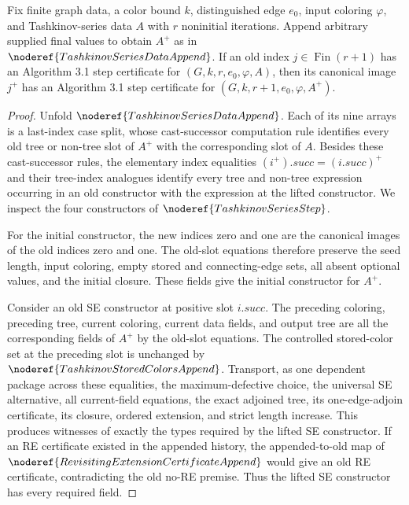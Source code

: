 \begin{lemma}
Fix finite graph data, a color bound \(k\), distinguished edge \(e_0\), input
coloring \(\varphi\), and Tashkinov-series data \(A\) with \(r\) noninitial
iterations.  Append arbitrary supplied final values to obtain \(A^+\) as in
\(\noderef{TashkinovSeriesDataAppend}\).  If an old index
\(j\in\operatorname{Fin}(r+1)\) has an Algorithm 3.1 step certificate for
\((G,k,r,e_0,\varphi,A)\), then its canonical image \(j^+\) has an Algorithm
3.1 step certificate for \((G,k,r+1,e_0,\varphi,A^+)\).
\end{lemma}
\begin{proof}
Unfold \(\noderef{TashkinovSeriesDataAppend}\).  Each of its nine arrays is a
last-index case split, whose cast-successor computation rule identifies every
old tree or non-tree slot of \(A^+\) with the corresponding slot of \(A\).
Besides these cast-successor rules, the elementary index equalities
\((i^+).succ=(i.succ)^+\) and their tree-index analogues identify every tree
and non-tree expression occurring in an old constructor with the expression
at the lifted constructor.  We inspect the four constructors of
\(\noderef{TashkinovSeriesStep}\).

For the initial constructor, the new indices zero and one are the canonical
images of the old indices zero and one.  The old-slot equations therefore
preserve the seed length, input coloring, empty stored and connecting-edge
sets, all absent optional values, and the initial closure.  These fields give
the initial constructor for \(A^+\).

Consider an old SE constructor at positive slot \(i.succ\).  The preceding
coloring, preceding tree, current coloring, current data fields, and output
tree are all the corresponding fields of \(A^+\) by the old-slot equations.
The controlled stored-color set at the preceding slot is unchanged by
\(\noderef{TashkinovStoredColorsAppend}\).  Transport, as one dependent
package across these equalities, the maximum-defective choice, the universal
SE alternative, all current-field equations, the exact adjoined tree, its
one-edge-adjoin certificate, its closure, ordered extension, and strict length
increase.  This produces witnesses of exactly the types required by the
lifted SE constructor.  If an RE certificate existed in the appended history,
the appended-to-old map of
\(\noderef{RevisitingExtensionCertificateAppend}\) would give an old RE
certificate, contradicting the old no-RE premise.  Thus the lifted SE
constructor has every required field.


\end{proof}
